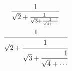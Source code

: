 \documentclass{book}
\begin{document}
\setcounter{chapter}{6}

\begin{gather}
\frac{1}{\sqrt{2}+\frac{1}{\sqrt{3}+
\frac{1}{\sqrt{4}+\cdots}}}\\
\cfrac{1}{\sqrt{2}+\cfrac{1}{\sqrt{3}+
\cfrac[r]{1}{\sqrt{4}+\cdots}}}
\end{gather}
\end{document}
